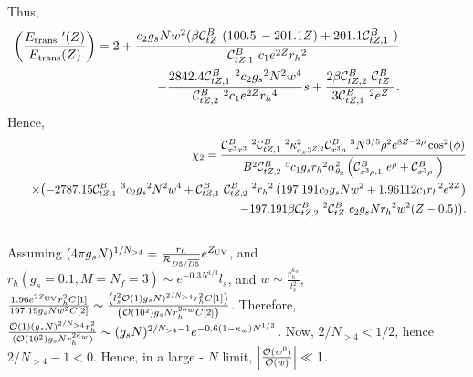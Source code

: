 Thus,
{\footnotesize
\begin{eqnarray}
\label{dEtransoverEtransuptobetauptow4}
& & \hskip -0.8in \left(\frac{E_{\rm trans}\ '(Z)}{E_{\rm trans}(Z)}\right) = 2 + \frac{c_2 {g_s} N
   w^2 (\beta  {\cal C}_{tZ}^B\  (100.5\, -201.1 Z)+201.1
   {\cal C}_{tZ,1}^B\ )}{{\cal C}_{tZ,1}^B\  c_1 e^{2Z}
   {r_h}^2}\nonumber \\ 
& & -\frac{2842.4 {\cal C}_{tZ,1}^B\ ^2 c_2 {g_s}^2
   N^2 w^4}{{\cal C}_{tZ,2}^B\ ^2 c_1 e^{2Z}
   {r_h}^4}s   +\frac{2 \beta  {\cal C}_{tZ,2}^B\ 
   {\cal C}_{tZ}^B\ }{3 {\cal C}_{tZ,1}^B\ ^2 e^Z}.
\end{eqnarray}
}
Hence,
{\scriptsize
\begin{eqnarray}
\label{Chi2}
& & \chi_2 = \frac{{\cal C}_{x^3x^3}^B\ ^2 {\cal C}_{tZ,1}^B\ ^2 \kappa_{a_x3^{Z,2}}^2
   {\cal C}_{x^3\rho}^B\ ^3 N^{3/5} \rho ^2 e^{8 Z-2 \rho } \cos ^2(\phi )
  }{B^2
   {\cal C}_{tZ,2}^B\ ^5 c_1 {g_s} {r_h}^2 \alpha _{\theta _2}^2
   \left({\cal C}_{x^3\rho,1}^B\  e^{\rho }+{\cal C}_{x^3\rho}^B\ \right)}\nonumber\\
& & \quad\times  \bigl(-2787.15 {\cal C}_{tZ,1}^B\ ^3 c_2 {g_s}^2 N^2 w^4+{\cal C}_{tZ,1}^B\ 
   {\cal C}_{tZ,2}^B\ ^2 {r_h}^2 \left(197.191 c_2 {g_s} N w^2+1.96112 c_1
   {r_h}^2 e^{2 Z}\right)\nonumber \\ 
& & \quad -197.191 \beta  {\cal C}_{tZ,2}^B\ ^2
   {\cal C}_{tZ}^B\  c_2 {g_s} N {r_h}^2 w^2 (Z-0.5)\bigl).\nonumber\\
& &    
\end{eqnarray}
}
Assuming $(4 \pi g_s N)^{1/N_{>4}} = \frac{r_h}{{\cal R}_{D5/\overline{D5}}} e^{Z_{\rm UV}}$, and $r_h (g_s = 0.1, M = N_f = 3)\sim e^{-0.3 N^{1/3}} l_s$, and $w\sim \frac{r_h^{\kappa_w}}{l_s^2}$, 
$\frac{1.96 e^{2 Z_{\rm UV}} r_h^2 C[1]}{ 
 197.19 g_s N w^2 C[2]} \sim \frac{\left(l_s^2{\cal O} (1) g_s N)^{2/N_{>4}} r_h^2 C[1]\right)}{\left({\cal O} (10^2) g_s N r_h^{2 \kappa_w} C[2]\right)}$. Therefore, $\frac{{\cal O} (1) 
    (g_s N)^{2/N_{>4}} r_h^2}{({\cal O} (10^2) g_s N r_h^{2 \kappa_w})} \sim 
    (g_s N)^{2/N_{>4} - 1} e^{-0.6 (1 - \kappa_w) N^{1/3}}$. Now, $2/N_{>4} < 1/2$, hence $2/N_{>4} - 1 < 0$. Hence, in a large - $N$ limit, $\left| \frac{{\cal O} (w^0)}{{\cal O} (w)}\right| \ll 1$.

